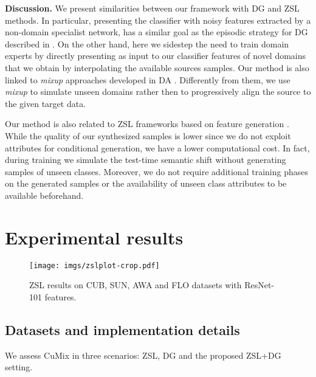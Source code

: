 \documentclass[runningheads]{llncs}
\newcommand{\myparagraph}[1]{\noindent\textbf{#1}}
\newcommand{\methodName}{{CuMix} }
\begin{document}
\myparagraph{Discussion.} We present similarities between our framework with DG and ZSL methods. In particular, presenting the classifier with noisy features extracted by a non-domain specialist network, has a similar goal as the episodic strategy for DG described in \cite{li2019episodic}. On the other hand, here we sidestep the need to train domain experts by directly presenting as input to our classifier features of novel domains that we obtain by interpolating the available sources samples.  
Our method is also linked to \textit{mixup} approaches developed in DA {\cite{xu2019adversarial}}. Differently from them, we use \textit{mixup} to simulate unseen domains rather then to progressively align the source to the given target data.

Our method is also related to ZSL frameworks based on feature generation \cite{xian2018feature,xian2019fvaegan}. While the quality of our synthesized samples is lower since we do not exploit attributes for conditional generation, we have a lower computational cost. {In fact, during training we simulate the test-time semantic shift without generating samples of unseen classes. Moreover, we do not require additional training phases on the generated samples or the availability of unseen class attributes to be available beforehand.}

 
\section{Experimental results}
\begin{figure}[tb]
  \centering
  \texttt{[image: imgs/zslplot-crop.pdf]} 
   \caption{ZSL results on CUB, SUN, AWA and FLO datasets with ResNet-101 features.}
  \label{fig:zsl-results}
 \end{figure}

\subsection{Datasets and implementation details}
We assess \methodName in three scenarios: ZSL, DG and the proposed ZSL+DG setting. 
\end{document}
